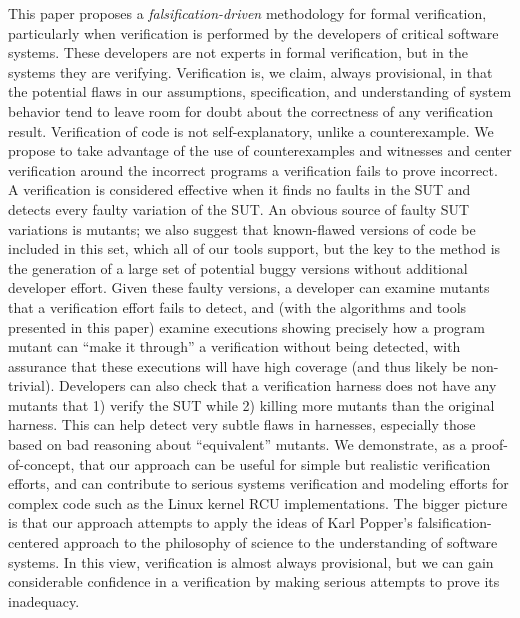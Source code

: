 \documentclass{svjour3}
\begin{document}
This paper proposes a \emph{falsification-driven} methodology for
formal verification, particularly when verification is performed by
the developers of critical software systems.  These developers are not
experts in formal verification, but in the systems they are verifying.
Verification is, we claim, always provisional, in that the potential
flaws in our assumptions, specification, and understanding of system
behavior tend to leave room for doubt about the correctness of any
verification result.  Verification of code is not self-explanatory,
unlike a counterexample.  We propose to take advantage of the use of
counterexamples and witnesses and center verification around the
incorrect programs a verification fails to prove incorrect.  A
verification is considered effective when it finds no faults in the
SUT and detects every faulty variation of the SUT.  An
obvious source of faulty SUT variations is mutants; we also suggest that
known-flawed versions of code be included in this set, which all of
our tools support, but the key to the method is the generation of a
large set of potential buggy versions without additional developer effort.  Given
these faulty versions, a developer can examine mutants that a verification
effort fails to detect, and (with the algorithms and tools presented
in this paper) examine executions showing precisely how a program
mutant can ``make it through'' a verification without being detected,
with assurance that these executions will have high coverage (and thus
likely be non-trivial).  Developers can also check that a verification
harness does not have any mutants that 1) verify the SUT while 2) killing
more mutants than the original harness.  This can help detect
very subtle flaws in harnesses, especially those based on bad
reasoning about ``equivalent'' mutants.  We demonstrate, as a
proof-of-concept, that our approach can be useful for simple but
realistic verification efforts, and can contribute to serious systems
verification and modeling efforts for complex code such as the Linux
kernel RCU implementations.  The bigger picture is that our approach
attempts to apply the ideas of Karl Popper's falsification-centered
approach to the philosophy of science to the understanding of software
systems.  In this view, verification is almost always provisional, but we can 
gain considerable confidence in a verification by making serious attempts to prove its inadequacy.
\end{document}
